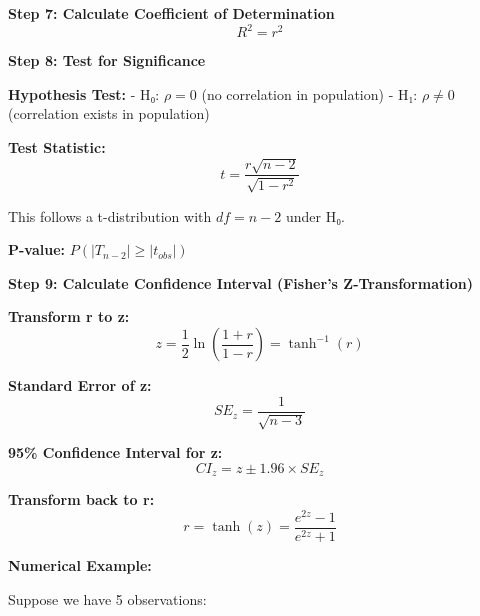 \documentclass[11pt]{article}
\begin{document}
\textbf{Step 7: Calculate Coefficient of Determination} \[R^2 = r^2\]

\textbf{Step 8: Test for Significance}

\textbf{Hypothesis Test:} - H₀: \(\rho = 0\) (no correlation in
population) - H₁: \(\rho \neq 0\) (correlation exists in population)

\textbf{Test Statistic:} \[t = \frac{r\sqrt{n-2}}{\sqrt{1-r^2}}\]

This follows a t-distribution with \(df = n - 2\) under H₀.

\textbf{P-value:} \(P(|T_{n-2}| \geq |t_{obs}|)\)

\textbf{Step 9: Calculate Confidence Interval (Fisher's
Z-Transformation)}

\textbf{Transform r to z:}
\[z = \frac{1}{2}\ln\left(\frac{1+r}{1-r}\right) = \tanh^{-1}(r)\]

\textbf{Standard Error of z:} \[SE_z = \frac{1}{\sqrt{n-3}}\]

\textbf{95\% Confidence Interval for z:}
\[CI_z = z \pm 1.96 \times SE_z\]

\textbf{Transform back to r:}
\[r = \tanh(z) = \frac{e^{2z}-1}{e^{2z}+1}\]

\textbf{Numerical Example:}

Suppose we have 5 observations:
\end{document}
